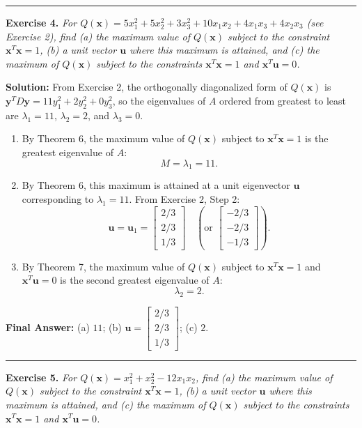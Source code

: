 \documentclass[11pt, letterpaper]{article}
\theoremstyle{definition}
\theoremstyle{remark}
\begin{document}
\medskip
\hrule
\medskip

\textbf{Exercise 4.} \emph{For $Q(\mathbf{x}) = 5x_1^2 + 5x_2^2 + 3x_3^2 + 10x_1x_2 + 4x_1x_3 + 4x_2x_3$ (see Exercise 2), find (a) the maximum value of $Q(\mathbf{x})$ subject to the constraint $\mathbf{x}^T\mathbf{x} = 1$, (b) a unit vector $\mathbf{u}$ where this maximum is attained, and (c) the maximum of $Q(\mathbf{x})$ subject to the constraints $\mathbf{x}^T\mathbf{x} = 1$ and $\mathbf{x}^T\mathbf{u} = 0$.}

\textbf{Solution:}
From Exercise 2, the orthogonally diagonalized form of $Q(\mathbf{x})$ is $\mathbf{y}^T D \mathbf{y} = 11y_1^2 + 2y_2^2 + 0y_3^2$, so the eigenvalues of $A$ ordered from greatest to least are $\lambda_1 = 11$, $\lambda_2 = 2$, and $\lambda_3 = 0$.
\begin{enumerate}[label=(\alph*)]
    \item By Theorem 6, the maximum value of $Q(\mathbf{x})$ subject to $\mathbf{x}^T\mathbf{x} = 1$ is the greatest eigenvalue of $A$:
    \[
    M = \lambda_1 = 11.
    \]
    \item By Theorem 6, this maximum is attained at a unit eigenvector $\mathbf{u}$ corresponding to $\lambda_1 = 11$. From Exercise 2, Step 2:
    \[
    \mathbf{u} = \mathbf{u}_1 = \begin{bmatrix} 2/3 \\ 2/3 \\ 1/3 \end{bmatrix} \quad \left(\text{or } \begin{bmatrix} -2/3 \\ -2/3 \\ -1/3 \end{bmatrix}\right).
    \]
    \item By Theorem 7, the maximum value of $Q(\mathbf{x})$ subject to $\mathbf{x}^T\mathbf{x} = 1$ and $\mathbf{x}^T\mathbf{u} = 0$ is the second greatest eigenvalue of $A$:
    \[
    \lambda_2 = 2.
    \]
\end{enumerate}
\textbf{Final Answer:} (a) $11$; \quad (b) $\mathbf{u} = \begin{bmatrix} 2/3 \\ 2/3 \\ 1/3 \end{bmatrix}$; \quad (c) $2$.

\medskip
\hrule
\medskip

\textbf{Exercise 5.} \emph{For $Q(\mathbf{x}) = x_1^2 + x_2^2 - 12x_1x_2$, find (a) the maximum value of $Q(\mathbf{x})$ subject to the constraint $\mathbf{x}^T\mathbf{x} = 1$, (b) a unit vector $\mathbf{u}$ where this maximum is attained, and (c) the maximum of $Q(\mathbf{x})$ subject to the constraints $\mathbf{x}^T\mathbf{x} = 1$ and $\mathbf{x}^T\mathbf{u} = 0$.}
\end{document}
